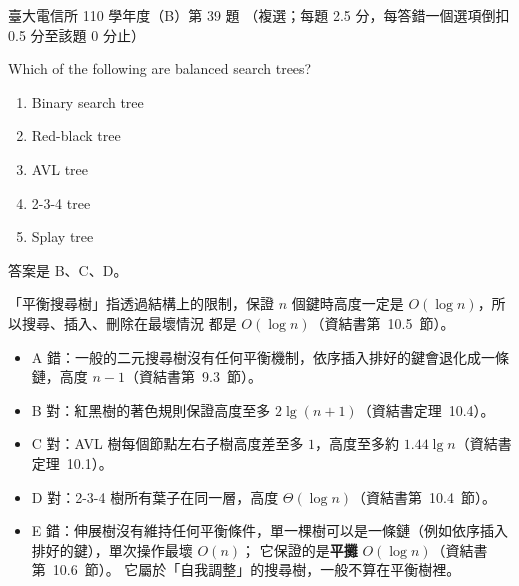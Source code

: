 \begin{pastexam}[label={px:ntu-110-comm-dsa-39}]{臺大電信所 110 學年度（B）第 39 題}
（複選；每題 2.5 分，每答錯一個選項倒扣 0.5 分至該題 0 分止）

Which of the following are balanced search trees?
\begin{enumerate}[label=\Alph*.]
\item Binary search tree
\item Red-black tree
\item AVL tree
\item 2-3-4 tree
\item Splay tree
\end{enumerate}
\end{pastexam}

\begin{pastsoln}
答案是 B、C、D。

「平衡搜尋樹」指透過結構上的限制，保證 $n$ 個鍵時高度一定是 $O(\log n)$，所以搜尋、插入、刪除在最壞情況
都是 $O(\log n)$（資結書第~10.5~節）。
\begin{itemize}
\item A 錯：一般的二元搜尋樹沒有任何平衡機制，依序插入排好的鍵會退化成一條鏈，高度 $n - 1$（資結書第~9.3~節）。
\item B 對：紅黑樹的著色規則保證高度至多 $2\lg(n + 1)$（資結書定理~10.4）。
\item C 對：AVL 樹每個節點左右子樹高度差至多 $1$，高度至多約 $1.44\lg n$（資結書定理~10.1）。
\item D 對：2-3-4 樹所有葉子在同一層，高度 $\Theta(\log n)$（資結書第~10.4~節）。
\item E 錯：伸展樹沒有維持任何平衡條件，單一棵樹可以是一條鏈（例如依序插入排好的鍵），單次操作最壞 $O(n)$；
它保證的是\textbf{平攤} $O(\log n)$（資結書第~10.6~節）。 它屬於「自我調整」的搜尋樹，一般不算在平衡樹裡。
\end{itemize}
\end{pastsoln}

